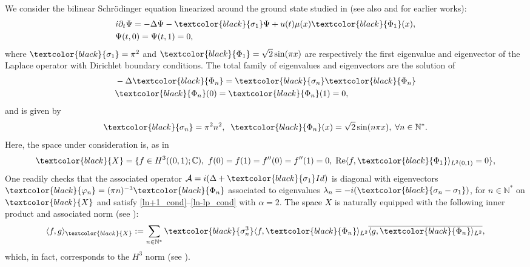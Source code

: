 \documentclass[11pt, dvipsnames]{amsart}
\begin{document}
We consider the bilinear Schrödinger equation linearized around the ground state studied in \cite{Coron2018-rapid,nguyen2024rapid} (see also \cite{beauchard2010local,beauchard2014local} and \cite{machtyngier1994stabilization,dehman2006stabilization} for earlier works):
\begin{equation}
\label{eq:linearschro}
    \begin{split}
        &i\partial_{t}\Psi = -\Delta \Psi-\textcolor{black}{\sigma_{1}}\Psi+u(t)\mu(x)\textcolor{black}{\Phi_{1}}(x),\\
        &\Psi(t,0)=\Psi(t,1)=0,
    \end{split}
\end{equation}
where $\textcolor{black}{\sigma_{1}}=\pi^{2}$ and $\textcolor{black}{\Phi_{1}} = \sqrt{2}\sin(\pi x)$ are respectively the first eigenvalue and eigenvector of the Laplace operator with Dirichlet boundary conditions. The total family of eigenvalues and eigenvectors are the solution of 
\begin{equation}
\begin{split}
    &-\Delta \textcolor{black}{\Phi_{n}} = \textcolor{black}{\sigma_{n}}\textcolor{black}{\Phi_{n}}\\
    &\textcolor{black}{\Phi_{n}}(0) = \textcolor{black}{\Phi_{n}}(1) = 0,
    \end{split}
\end{equation}
and is given by
\begin{equation}
\textcolor{black}{\sigma_{n}}=\pi^{2}n^{2},\;\;\textcolor{black}{\Phi_{n}}(x) = \sqrt{2}\sin(n\pi x),\;\forall n\in\mathbb{N}^{*}.
\end{equation}
Here, the space under consideration is, as in \cite{Coron2018-rapid,nguyen2024rapid}
\begin{equation}
\textcolor{black}{X}=\{f\in H^{3}((0,1);\mathbb{C}),\ f(0)=f(1)=f''(0)=f''(1)=0,\; \text{Re}\langle f,\textcolor{black}{\Phi_{1}}\rangle_{L^{2}(0,1)} = 0\},
\end{equation}
One readily checks that the associated operator $\mathcal{A} = i(\Delta +\textcolor{black}{\sigma_{1}}Id)$ is diagonal with eigenvectors 
$\textcolor{black}{\varphi_{n}} = (\pi n)^{-3}\textcolor{black}{\Phi_{n}}$ associated to eigenvalues $\lambda_{n} = -i(\textcolor{black}{\sigma_{n}-\sigma_{1}})$, for $n\in\mathbb{N}^{*}$ on $\textcolor{black}{X}$ 
and satisfy \eqref{ln+1_cond}--\eqref{ln-lp_cond} with $\alpha=2$. \textcolor{black}{The space $X$} is naturally equipped with the following inner product and associated norm (see \cite{Coron2018-rapid}): 
\begin{equation}
\begin{split}
\langle f, g\rangle_{\textcolor{black}{X}}:= \sum\limits_{n\in\mathbb{N}^{*}}
\textcolor{black}{\sigma_{n}^{3}}\langle f,\textcolor{black}{\Phi_{n}}\rangle_{L^{2}}\overline{\langle g,\textcolor{black}{\Phi_{n}}\rangle_{L^{2}}},%
\end{split}
\end{equation}
which, in fact, corresponds to the $H^{3}$ norm (see \cite[Section 1]{nguyen2024rapid}).
\end{document}
